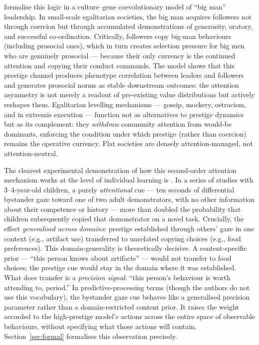 \citet{henrichChudekBoyd2015BigMan} formalise this logic in a
culture--gene coevolutionary model of ``big man'' leadership.
In small-scale egalitarian societies, the big man acquires followers not through
coercion but through accumulated demonstrations of generosity, oratory, and
successful co-ordination.
Critically, followers copy big-man behaviours (including prosocial ones), which
in turn creates selection pressure for big men who are genuinely prosocial —
because their only currency is the continued attention and copying their conduct
commands.
The model shows that this prestige channel produces phenotype correlation between
leaders and followers and generates prosocial norms as stable downstream
outcomes: the attention asymmetry is not merely a readout of pre-existing value
distributions but actively reshapes them.
Egalitarian levelling mechanisms — gossip, mockery, ostracism, and in extremis
execution — function not as alternatives to prestige dynamics but as its
complement: they \emph{withdraw} community attention from would-be dominants,
enforcing the condition under which prestige (rather than coercion) remains the
operative currency.
Flat societies are densely attention-managed, not attention-neutral.

The clearest experimental demonstration of how this second-order attention
mechanism works at the level of individual learning is \citet{chudek2012BystanderGaze}.
In a series of studies with 3--4-year-old children, a purely \emph{attentional}
cue — ten seconds of differential bystander gaze toward one of two adult
demonstrators, with no other information about their competence or history — more
than doubled the probability that children subsequently copied that demonstrator
on a novel task.
Crucially, the effect \emph{generalised across domains}: prestige established
through others' gaze in one context (e.g., artifact use) transferred to
unrelated copying choices (e.g., food preferences).
This domain-generality is theoretically decisive.
A content-specific prior — ``this person knows about artifacts'' — would not
transfer to food choices; the prestige cue would stay in the domain where it was
established.
What does transfer is a \emph{precision signal}: ``this person's behaviour is
worth attending to, period.''
In predictive-processing terms (though the authors do not use this vocabulary),
the bystander gaze cue behaves like a generalised precision parameter rather than
a domain-restricted content prior.
It raises the weight accorded to the high-prestige model's actions across the
entire space of observable behaviours, without specifying what those actions will
contain.
Section~\ref{sec:formal} formalises this observation precisely.

